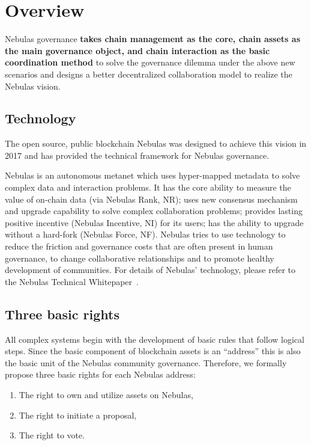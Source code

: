 \section{Overview}

Nebulas governance \textbf{takes chain management as the core, chain assets as the main governance object, and chain interaction as the basic coordination method} to solve the governance dilemma under the above new scenarios and designs a better decentralized collaboration model to realize the Nebulas vision.

\subsection{Technology}

The open source, public blockchain Nebulas was designed to achieve this vision in 2017 and has provided the technical framework for Nebulas governance.

Nebulas is an autonomous metanet which uses hyper-mapped metadata to solve complex data and interaction problems. It has the core ability to measure the value of on-chain data (via Nebulas Rank, NR); uses new consensus mechanism and upgrade capability to solve complex collaboration problems; provides lasting positive incentive (Nebulas Incentive, NI) for its users; has the ability to upgrade without a hard-fork (Nebulas Force, NF). Nebulas tries to use technology to reduce the friction and governance costs that are often present in human governance, to change collaborative relationships and to promote healthy development of communities. For details of Nebulas' technology, please refer to the Nebulas Technical Whitepaper~\cite{TechWhitepaper}.

\subsection{Three basic rights}
\label{rights}

All complex systems begin with the development of basic rules that follow logical steps. Since the basic component of blockchain assets is an “address” this is also the basic unit of the Nebulas community governance. Therefore, we formally propose three basic rights for each Nebulas address:

\begin{enumerate}
	\item The right to own and utilize assets on Nebulas,
	\item The right to initiate a proposal,
	\item The right to vote.
\end{enumerate}


